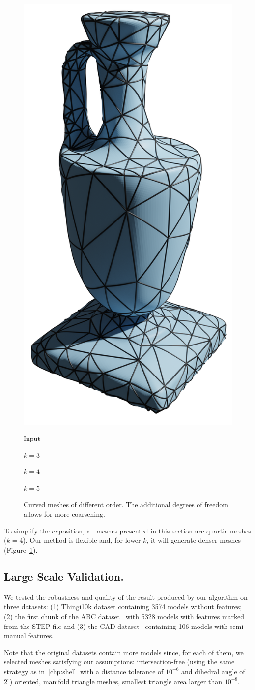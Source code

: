 \begin{figure}
    \includegraphics[width=.23\linewidth]{curve_meshing_in_shell_tex/figs/anphora/0003}
     \parbox{.24\linewidth}{\centering Input}\hfill
    \parbox{.24\linewidth}{\centering $k=3$}\hfill
    \parbox{.24\linewidth}{\centering $k=4$}\hfill
    \parbox{.24\linewidth}{\centering $k=5$}
    \caption{Curved meshes of different order. The additional degrees of freedom allows for more coarsening.}
    \label{bichon:fig:diff-k}
\end{figure}

To simplify the exposition, all meshes presented in this section are quartic meshes ($k=4$). Our method is flexible and, for lower $k$, it will generate denser meshes (Figure~\ref{bichon:fig:diff-k}).

\subsection{Large Scale Validation.}

We tested the robustness and quality of the result produced by our algorithm on three datasets: (1) Thingi10k dataset \cite{zhou2016thingi10k} containing 3574 models without features; (2) the first chunk {of} the ABC dataset~\cite{Koch_2019_CVPR} with 5328 models with features marked from the STEP file and (3) the CAD dataset~\cite{Gao:2019} containing 106 models with semi-manual features.

Note that the original datasets contain more models since, for each of them, we selected meshes satisfying our assumptions: intersection-free (using the same strategy as in~\ref{chp:shell} with a distance tolerance of $10^{-6}$ and dihedral angle of $2^\circ$) oriented, manifold triangle meshes, smallest triangle area larger than $10^{-8}$. 





